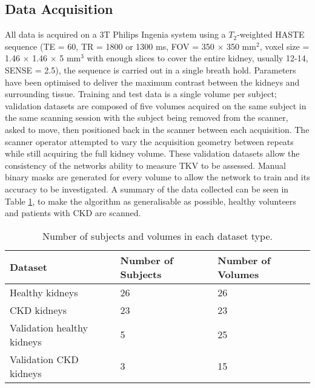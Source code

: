 \subsection{Data Acquisition}
\label{sec:ml_methods_acquisition}
All data is acquired on a 3T Philips Ingenia system using a $T_2$-weighted \ac{HASTE} sequence (\ac{TE} = 60, \ac{TR} = 1800 or 1300 ms, \ac{FOV} = 350 $\times$ 350 mm$^2$, voxel size = 1.46 $\times$ 1.46 $\times$ 5 mm$^3$ with enough slices to cover the entire kidney, usually 12-14, \ac{SENSE} = 2.5), the sequence is carried out in a single breath hold. Parameters have been optimised to deliver the maximum contrast between the kidneys and surrounding tissue. Training and test data is a single volume per subject; validation datasets are composed of five volumes acquired on the same subject in the same scanning session with the subject being removed from the scanner, asked to move, then positioned back in the scanner between each acquisition. The scanner operator attempted to vary the acquisition geometry between repeats while still acquiring the full kidney volume. These validation datasets allow the consistency of the networks ability to measure \ac{TKV} to be assessed. Manual binary masks are generated for every volume to allow the network to train and its accuracy to be investigated. A summary of the data collected can be seen in Table \ref{tab:ml_data}, to make the algorithm as generalisable as possible, healthy volunteers and patients with \ac{CKD} are scanned.

\begin{table}[H]
	\centering
	\begin{tabular}{|l|l|l|}
		\hline
		\textbf{Dataset}           & \textbf{Number of Subjects} & \textbf{Number of Volumes} \\ \hline
		Healthy kidneys            & 26                            & 26                         \\ \hline
		\ac{CKD} kidneys           & 23                            & 23                         \\ \hline
		Validation healthy kidneys & 5                             & 25                         \\ \hline
		Validation \ac{CKD} kidneys& 3                             & 15                         \\ \hline
	\end{tabular}
	\caption{Number of subjects and volumes in each dataset type.}
	\label{tab:ml_data}
\end{table}

